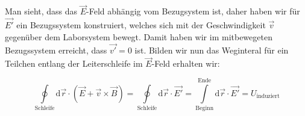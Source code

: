 Man sieht, dass das $\vec{E}$-Feld abhängig vom Bezugsystem ist, daher haben wir für $\vec{E'}$ ein Bezugssystem konstruiert, welches sich mit der Geschwindigkeit $\vec{v}$ gegenüber dem Laborsystem bewegt. Damit haben wir im mitbewegeten Bezugssystem erreicht, dass $\vec{v'} = 0$ ist. Bilden wir nun das Weginteral für ein Teilchen entlang der Leiterschleife im $\vec{E}$-Feld erhalten wir:

\begin{equation*}
\oint\limits_{\mathrm{Schleife}}\mathrm{d}\vec{r}\cdot\left(\vec{E} + \vec{v}\times\vec{B}\right) = \oint\limits_{\mathrm{Schleife}}\mathrm{d}\vec{r}\cdot\vec{E'} = \int\limits_{\mathrm{Beginn}}^{\mathrm{Ende}}\mathrm{d}\vec{r}\cdot\vec{E'} = U_{\mathrm{induziert}}
\end{equation*}